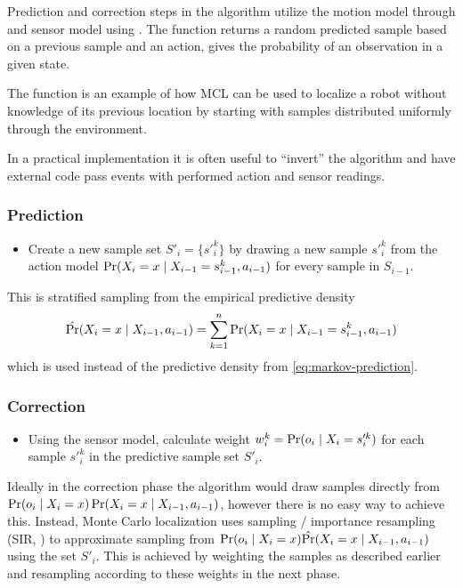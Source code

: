 Prediction and correction steps in the algorithm utilize the motion
model through \sampleFromActionModel{} and sensor model using \observationProbability{}.
The function \sampleFromActionModel{} returns a random predicted sample based on a previous sample and an action,
\observationProbability{} gives the probability of an observation in a given state.

The \initialize{} function is an example of how MCL can be used to localize
a robot without knowledge of its previous location by starting with samples distributed
uniformly through the environment.

In a practical implementation it is often useful to \enquote{invert} the algorithm and
have external code pass events with performed action and sensor readings.

\subsubsection{Prediction}
\begin{itemize}
\item
Create a new sample set \(S'_i = \{s'^k_{i}\} \)
by drawing a new sample \(s'^k_{i}\)
from the action model \(\operatorname{\mathrm{Pr}}(X_i = x \mid X_{i-1} = s^k_{i-1}, a_{i - 1})\)
for every sample in \(S_{i-1}\).
\end{itemize}

This is stratified sampling from the empirical predictive density
\begin{equation}
	\label{eq:mcl-predictive-density}
	\hat{\operatorname{\mathrm{Pr}}}(X_i = x \mid X_{i - 1}, a_{i - 1}) =
	\sum_{k = 1}^n \operatorname{\mathrm{Pr}}(X_i = x \mid X_{i-1} = s^k_{i-1}, a_{i - 1})
\end{equation}
which is used instead of the predictive density from \eqref{eq:markov-prediction}.

\subsubsection{Correction}
\begin{itemize}
\item
Using the sensor model, calculate weight \(w^k_i = \operatorname{\mathrm{Pr}}(o_i \mid X_i = s'^k_i)\)
for each sample \(s'^k_i\) in the predictive sample set \(S'_i\).
\end{itemize}

Ideally in the correction phase the algorithm would draw samples directly from
\(\operatorname{\mathrm{Pr}}(o_i \mid X_i = x) \operatorname{\mathrm{Pr}}(X_i = x \mid X_{i - 1}, a_{i - 1})\),
however there is no easy way to achieve this.
Instead, Monte Carlo localization 
uses sampling / importance resampling (SIR, \cite{smith92})
to approximate sampling from
\(\operatorname{\mathrm{Pr}}(o_i \mid X_i = x) \hat{\operatorname{\mathrm{Pr}}}(X_i = x \mid X_{i - 1}, a_{i - 1})\) using the set \(S'_i\).
This is achieved by weighting the samples as described earlier and resampling
according to these weights in the next phase.

